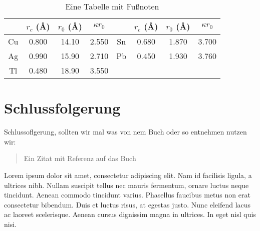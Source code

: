 \documentclass[aps,twocolumn,secnumarabic,nobalancelastpage,amsmath,amssymb,
nofootinbib,superscriptaddress]{revtex4-1}
\begin{document}
\begin{table}[h]
\caption{\label{tab:table1}Eine Tabelle mit Fußnoten}
\begin{ruledtabular}
\begin{tabular}{cccccccc}
 &$r_c$ (\AA)&$r_0$ (\AA)&$\kappa r_0$&
 &$r_c$ (\AA) &$r_0$ (\AA)&$\kappa r_0$\\
\hline
Cu& 0.800 & 14.10 & 2.550 &Sn\footnotemark[1] & 0.680 & 1.870 & 3.700 \\
Ag& 0.990 & 15.90 & 2.710 &Pb\footnotemark[1] & 0.450 & 1.930 & 3.760 \\
Tl& 0.480 & 18.90 & 3.550 & & & & \\
\end{tabular}
\end{ruledtabular}
\end{table}




\section{Schlussfolgerung}

Schlussoflgerung, sollten wir mal was von nem Buch oder so entnehmen nutzen wir:


\begin{quote}
  Ein Zitat mit Referenz auf das Buch\cite{melissinos1966}
\end{quote}

Lorem ipsum dolor sit amet, consectetur adipiscing elit. Nam id facilisis ligula,
a ultrices nibh. Nullam suscipit tellus nec mauris fermentum, ornare luctus neque
tincidunt. Aenean commodo tincidunt varius. Phasellus faucibus metus non erat
consectetur bibendum. Duis et luctus risus, at egestas justo. Nunc eleifend lacus
ac laoreet scelerisque. Aenean cursus dignissim magna in ultrices. In eget nisl
quis nisi.
\end{document}
